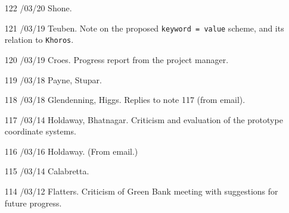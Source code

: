 \begin{enumerate}
\item[122]
/03/20 Shone.

\item[121]
/03/19 Teuben.
\linebreak  Note on the proposed \texttt{keyword = value} scheme, and its relation
   to \texttt{Khoros}.

\item[120]
/03/19 Croes.
\linebreak  Progress report from the project manager.

\item[119]
/03/18 Payne, Stupar.

\item[118]
/03/18 Glendenning, Higgs.
\linebreak  Replies to note 117 (from email).

\item[117]
/03/14 Holdaway, Bhatnagar.
\linebreak  Criticism and evaluation of the prototype coordinate systems.

\item[116]
/03/16 Holdaway.
\linebreak  (From email.)

\item[115]
/03/14 Calabretta.

\item[114]
/03/12 Flatters.
\linebreak  Criticism of Green Bank meeting with suggestions for future progress.


\end{enumerate}

